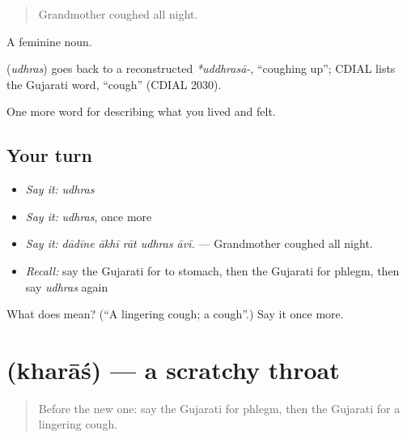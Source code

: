 \begin{quote}
Grandmother coughed all night.
\end{quote}

A feminine noun.

\begin{cousinweb}
\textbf{} (\emph{udhras}) goes back to a reconstructed \emph{*uddhrasā-}, \textquotedblleft{}coughing up\textquotedblright{}; CDIAL lists the Gujarati word, \textquotedblleft{}cough\textquotedblright{} (CDIAL 2030).
\end{cousinweb}

\begin{grammarlens}[title={What you've built}]
One more word for describing what you lived and felt.
\end{grammarlens}

\subsection*{Your turn}
\begin{itemize}
\raggedright
  \item \emph{Say it:} \emph{udhras}
  \item \emph{Say it:} \emph{udhras}, once more
  \item \emph{Say it:} \emph{dādīne ākhī rāt udhras āvī.} — Grandmother coughed all night.
  \item \emph{Recall:} say the Gujarati for to stomach, then the Gujarati for phlegm, then say \emph{udhras} again
\end{itemize}

\begin{tcolorbox}[breakable,colback=teal!4,colframe=teal!35!black,title={Before you move on}]
What does  mean? (\textquotedblleft{}A lingering cough; a cough\textquotedblright{}.) Say it once more.
\end{tcolorbox}
\section[\texorpdfstring{\gu{ખરાશ} (kharāś)}{ખરાશ (kharāś)}]{ (kharāś) — a scratchy throat}

\label{lesson:GU-C478-kharas}



\begin{quote}
Before the new one: say the Gujarati for phlegm, then the Gujarati for a lingering cough.
\end{quote}


